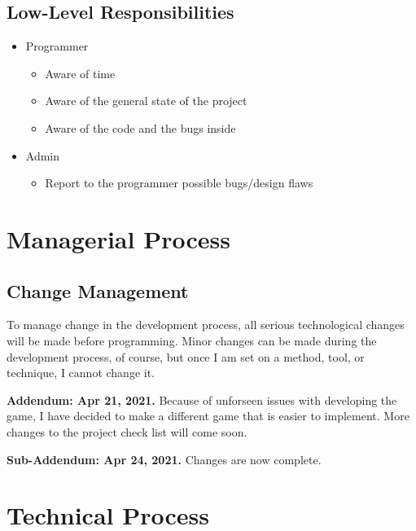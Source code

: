 \documentclass[11pt]{article}
\begin{document}
\subsection{Low-Level Responsibilities}
\label{sec:org9c0ba7a}
\begin{itemize}
\item Programmer
\begin{itemize}
\item Aware of time
\item Aware of the general state of the project
\item Aware of the code and the bugs inside
\end{itemize}
\item Admin
\begin{itemize}
\item Report to the programmer possible bugs/design flaws
\end{itemize}
\end{itemize}
\section{Managerial Process}
\label{sec:org381ea91}
\subsection{Change Management}
\label{sec:org4b02aaa}
To manage change in the development process, all serious technological changes will be made before programming.
Minor changes can be made during the development process, of course, but once I am set on a method, tool,
or technique, I cannot change it.

\textbf{Addendum: Apr 21, 2021.}
Because of unforseen issues with developing the game, I have decided to make a different game that is easier to
implement. More changes to the project check list will come soon.

\textbf{Sub-Addendum: Apr 24, 2021.}
Changes are now complete. 
\section{Technical Process}
\label{sec:org089bd56}
\end{document}
